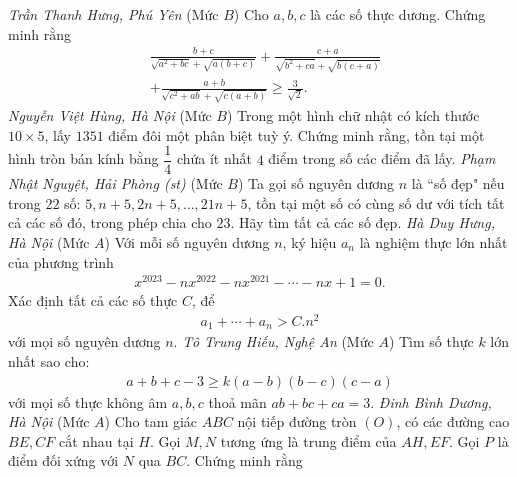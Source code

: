 \begin{multicols}{2}
\begin{figure}[H]
		\vspace*{-10pt}
	\end{figure}
	\vskip 0.05cm
	\hfill \textit{Trần Thanh Hưng, Phú Yên}
	\vskip 0.05cm
	{}
	(Mức $B$) Cho $a, b, c$ là các số thực dương. Chứng minh rằng
	\begin{align*}
		&\frac{b+c}{\sqrt{\!a^2\!+\!b c}\!+\!\!\sqrt{\!a(b+c)}}\!+\!\frac{c\!+\!a}{\sqrt{\!b^2\!+\!c a}\!+\!\!\sqrt{\!b(c\!+\!a)}}\\
		&+\frac{a+b}{\sqrt{c^2+a b}+\sqrt{c(a+b)}} \geq \frac{3}{\sqrt{2}} .
	\end{align*}
	\vskip 0.05cm
	\hfill	\textit{Nguyễn Việt Hùng, Hà Nội}
	\vskip 0.05cm
	{}
	(Mức $B$) Trong một hình chữ nhật có kích thước $10\times 5$, lấy $1351$ điểm đôi một phân biệt tuỳ ý. Chứng minh rằng, tồn tại một hình tròn bán kính bằng $\dfrac14$ chứa ít nhất $4$ điểm trong số các điểm đã lấy.
	\vskip 0.05cm
	\hfill	\textit{Phạm Nhật Nguyệt, Hải Phòng (st)}
	\vskip 0.05cm
	{}
	(Mức $B$) Ta gọi số nguyên dương $n$ là ``số đẹp" nếu trong $22$ số: $5,n+5,2n+5,\ldots,21n+5$, tồn tại một số có cùng số dư với tích tất cả các số đó, trong phép chia cho $23$. Hãy tìm tất cả các số đẹp.
	\vskip 0.05cm
	\hfill	\textit{Hà Duy Hưng, Hà Nội}
	\vskip 0.05cm
	{}
	(Mức $A$) Với mỗi số nguyên dương $n$, ký hiệu $a_n$ là nghiệm thực lớn nhất của phương trình
	\begin{align*}
		x^{2023}-nx^{2022}-nx^{2021}-\cdots-nx+1=0.
	\end{align*}
	Xác định tất cả các số thực $C$, để 
	\begin{align*}
		a_1+\cdots+a_n>C. n^2
	\end{align*}
	với mọi số nguyên dương $n$.
	\vskip 0.05cm
	\hfill	\textit{Tô Trung Hiếu, Nghệ An}
	\vskip 0.05cm
	{}
	(Mức $A$) Tìm số thực $k$ lớn nhất sao cho: 
	\begin{align*}
		a+b+c-3\ge k(a-b)(b-c)(c-a)
	\end{align*}
	với mọi số thực không âm $a,b,c$ thoả mãn $ab+bc+ca=3$. 
	\vskip 0.05cm
	\hfill\textit{Đinh Bình Dương, Hà Nội}
	\vskip 0.05cm
	{}
	(Mức $A$) Cho tam giác  $ABC$ nội tiếp đường tròn $(O)$, có các đường cao $BE,CF$ cắt nhau tại $H$.  Gọi $M, N$ tương ứng là trung điểm của $AH, EF$. Gọi $P$ là điểm đối xứng với $N$ qua $BC$. Chứng minh rằng

\end{multicols}
